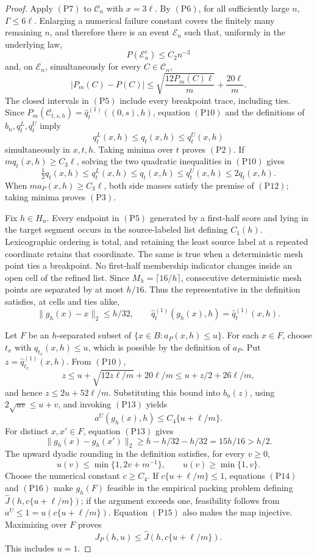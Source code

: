 \documentclass{article}
\begin{document}
\begin{proof}
Apply \((\mathrm{P7})\) to \(\mathcal C_n\) with \(x=3\ell\).  By
\((\mathrm{P6})\), for all sufficiently large \(n\),
\(\Gamma\leq6\ell\).  Enlarging a numerical failure constant covers the
finitely many remaining \(n\), and therefore there is an event
\(\mathcal E_n\) such that, uniformly in the underlying law,
\[
 P(\mathcal E_n^c)\leq C_2n^{-3}
 \tag{P9}
\]
and, on \(\mathcal E_n\), simultaneously for every \(C\in\mathcal C_n\),
\[
 |P_m(C)-P(C)|\leq
 \sqrt{\frac{12P_m(C)\ell}{m}}+\frac{20\ell}{m}.
 \tag{P10}
\]
The closed intervals in \((\mathrm{P5})\) include every breakpoint trace,
including ties.  Since
\(P_m(\mathcal C_{t,s,h})=\widehat q_t^{(1)}((0,s),h)\), equation
\((\mathrm{P10})\) and the definitions of \(b_n,q_t^L,q_t^U\) imply
\[
 q_t^L(x,h)\leq q_t(x,h)\leq q_t^U(x,h)
 \tag{P11}
\]
simultaneously in \(x,t,h\).  Taking minima over \(t\) proves
\((\mathrm{P2})\).  If \(mq_t(x,h)\geq C_3\ell\), solving the two quadratic
inequalities in \((\mathrm{P10})\) gives
\[
 \tfrac12q_t(x,h)\leq q_t^L(x,h)\leq q_t(x,h)
 \leq q_t^U(x,h)\leq2q_t(x,h).
 \tag{P12}
\]
When \(ma_P(x,h)\geq C_3\ell\), both side masses satisfy the premise of
\((\mathrm{P12})\); taking minima proves \((\mathrm{P3})\).

Fix \(h\in H_n\).  Every endpoint in \((\mathrm{P5})\) generated by a
first-half score and lying in the target segment occurs in the source-labeled
list defining \(C_1(h)\).  Lexicographic ordering is total, and retaining
the least source label at a repeated coordinate retains that coordinate.
The same is true when a deterministic mesh point ties a breakpoint.  No
first-half membership indicator changes inside an open cell of the refined
list.  Since \(M_h=\lceil16/h\rceil\), consecutive deterministic mesh
points are separated by at most \(h/16\).  Thus the representative in the
definition satisfies, at cells and ties alike,
\[
 \|g_h(x)-x\|_2\leq h/32,
 \qquad
 \widehat q_t^{(1)}(g_h(x),h)=\widehat q_t^{(1)}(x,h).
 \tag{P13}
\]

Let \(F\) be an \(h\)-separated subset of
\(\{x\in B:a_P(x,h)\leq u\}\).  For each \(x\in F\), choose
\(t_x\) with \(q_{t_x}(x,h)\leq u\), which is possible by the definition
of \(a_P\).  Put \(z=\widehat q_{t_x}^{(1)}(x,h)\).  From
\((\mathrm{P10})\),
\[
 z\leq u+\sqrt{12z\ell/m}+20\ell/m
 \leq u+z/2+26\ell/m,
\]
and hence \(z\leq2u+52\ell/m\).  Substituting this bound into \(b_n(z)\),
using \(2\sqrt{uv}\leq u+v\), and invoking \((\mathrm{P13})\) yields
\[
 a^U(g_h(x),h)\leq C_4\{u+\ell/m\}.
 \tag{P14}
\]
For distinct \(x,x'\in F\), equation \((\mathrm{P13})\) gives
\[
 \|g_h(x)-g_h(x')\|_2
 \geq h-h/32-h/32=15h/16>h/2.
 \tag{P15}
\]
The upward dyadic rounding in the definition satisfies, for every
\(v\geq0\),
\[
 u(v)\leq\min\{1,2v+m^{-1}\},
 \qquad
 u(v)\geq\min\{1,v\}.
 \tag{P16}
\]
Choose the numerical constant \(c\geq C_4\).  If
\(c\{u+\ell/m\}\leq1\), equations \((\mathrm{P14})\) and
\((\mathrm{P16})\) make \(g_h(F)\) feasible in the empirical packing
problem defining \(\widehat J(h,c\{u+\ell/m\})\); if the argument exceeds
one, feasibility follows from \(a^U\leq1=u(c\{u+\ell/m\})\).
Equation \((\mathrm{P15})\) also makes the map injective.  Maximizing over
\(F\) proves
\[
 J_P(h,u)\leq\widehat J(h,c\{u+\ell/m\}).
 \tag{P17}
\]
This includes \(u=1\).


\end{proof}
\end{document}

